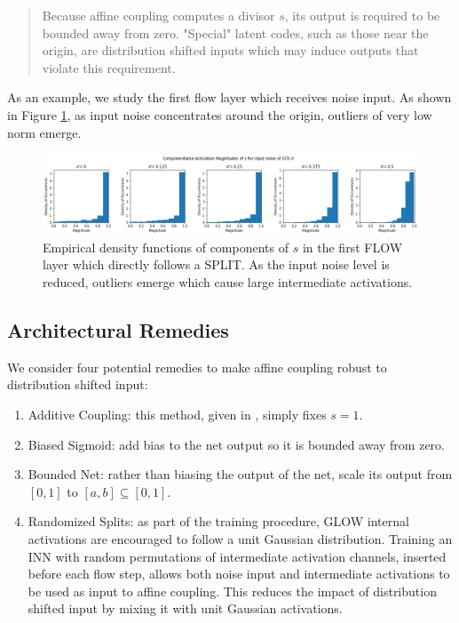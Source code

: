 \begin{quote}
Because affine coupling computes a divisor $s$, its output is required to be bounded away from zero. "Special" latent codes, such as those near the origin, are distribution shifted inputs which may induce outputs that violate this requirement.
\end{quote}

As an example, we study the first flow layer which receives noise input. As shown in Figure \ref{fig:sigma_plot}, as input noise concentrates around the origin, outliers of very low norm emerge.

\begin{figure}
    \centering
    \includegraphics[width=\linewidth]{figures/s_plots.png}
    \caption{Empirical density functions of components of $s$ in the first FLOW layer which directly follows a SPLIT. As the input noise level is reduced, outliers emerge which cause large intermediate activations.}
    \label{fig:sigma_plot}
\end{figure}


\subsection{Architectural Remedies}
We consider four potential remedies to make affine coupling robust to distribution shifted input:
\begin{enumerate}
    \item Additive Coupling: this method, given in \cite{kingma2018glow}, simply fixes $s=1$. 
    \item Biased Sigmoid: add bias to the net output so it is bounded away from zero.
    \item Bounded Net: rather than biasing the output of the net, scale its output from $[0, 1]$ to $[a,b] \subseteq [0, 1]$.
    \item Randomized Splits: as part of the training procedure, GLOW internal activations are encouraged to follow a unit Gaussian distribution. Training an INN with random permutations of intermediate activation channels, inserted before each flow step, allows both noise input and intermediate activations to be used as input to affine coupling. This reduces the impact of distribution shifted input by mixing it with unit Gaussian activations.
\end{enumerate}


